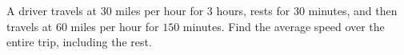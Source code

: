 A driver travels at $30$ miles per hour for $3$ hours, rests for $30$ minutes, and then travels at $60$ miles per hour for $150$ minutes. Find the average speed over the entire trip, including the rest.
